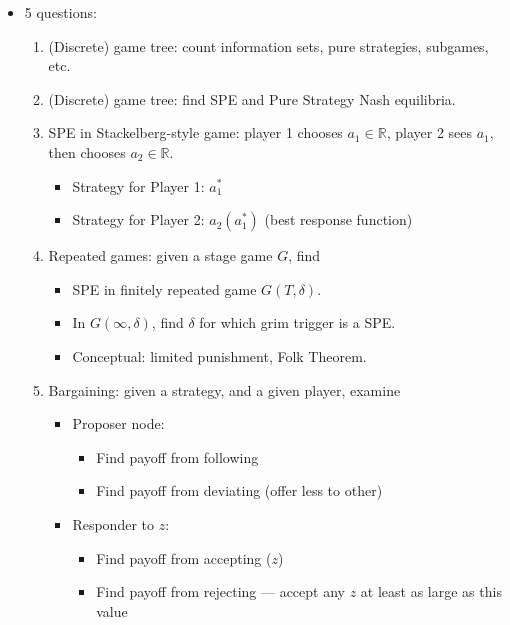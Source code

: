\documentclass[8pt]{extarticle}
\title{}
\author{}
\date{}
\newcommand{\R}{\mathbb{R}}
\begin{document}
  \begin{itemize}
  \item 5 questions:
    \begin{enumerate}[(1)]
      \item (Discrete) game tree: count information sets, pure strategies, subgames, etc.
      \item (Discrete) game tree: find SPE and Pure Strategy Nash equilibria.
      \item SPE in Stackelberg-style game: player 1 chooses $a_1\in\R$, player 2 sees $a_1$, then chooses $a_2\in\R$.
        \begin{itemize}
          \item Strategy for Player 1: $a_1^{\ast}$
          \item Strategy for Player 2: $a_2(a_1^{\ast})$ (best response function)
        \end{itemize}
      \item Repeated games: given a stage game $G$, find
        \begin{itemize}
          \item SPE in finitely repeated game $G(T,\delta)$.
          \item In $G(\infty,\delta)$, find $\delta$ for which grim trigger is a SPE.
          \item Conceptual: limited punishment, Folk Theorem.
        \end{itemize}
      \item Bargaining: given a strategy, and a given player, examine
        \begin{itemize}
          \item Proposer node:
            \begin{itemize}
              \item Find payoff from following
              \item Find payoff from deviating (offer less to other)
            \end{itemize}
          \item Responder to $z$:
            \begin{itemize}
              \item Find payoff from accepting ($z$)
              \item Find payoff from rejecting --- accept any $z$ at least as large as this value
            \end{itemize}
        \end{itemize}
    \end{enumerate}
  \end{itemize}
\end{document}

